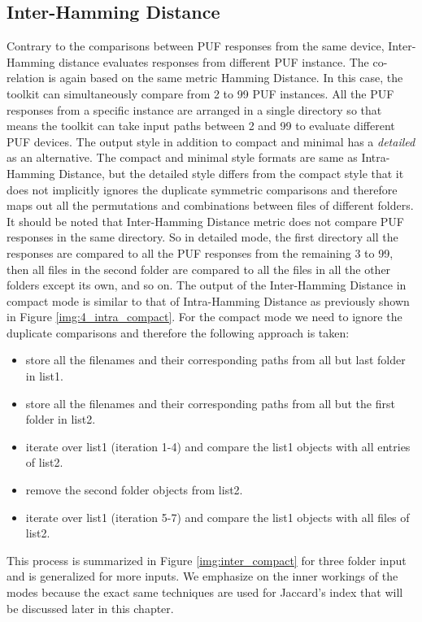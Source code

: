 \subsection{Inter-Hamming Distance}
\label{inter_hd_section}
Contrary to the comparisons between PUF responses from the same device, Inter-Hamming distance evaluates responses from different PUF instance. The co-relation is again based on the same metric Hamming Distance. In this case, the toolkit can simultaneously compare from 2 to 99 PUF instances. All the PUF responses from a specific instance are arranged in a single directory so that means the toolkit can take input paths between 2 and 99 to evaluate different PUF devices. The output
style in addition to compact and minimal has a \emph{detailed} as an alternative. The compact and minimal style formats are same as Intra-Hamming Distance, but the detailed style differs from the compact style that it does not implicitly ignores the duplicate symmetric comparisons and therefore maps out all the permutations and combinations between files of different folders. It should be noted that Inter-Hamming Distance metric does not compare PUF responses in the same directory. So
in detailed mode, the first directory all the responses are compared to all the PUF responses from the remaining 3 to 99, then all files in the second folder are compared to all the files in all the other folders except its own, and so on. The output of the Inter-Hamming Distance in compact mode is similar to that of Intra-Hamming Distance as previously shown in Figure \ref{img:4_intra_compact}. For the compact mode we need to ignore the duplicate comparisons and therefore the following approach is
taken:

\begin{itemize}
	\item store all the filenames and their corresponding paths from all but last folder in list1.
	\item store all the filenames and their corresponding paths from all but the first folder in list2.
	\item iterate over list1 (iteration 1-4) and compare the list1 objects with all entries of list2.
	\item remove the second folder objects from list2.
	\item iterate over list1 (iteration 5-7) and compare the list1 objects with all files of list2.
\end{itemize}

This process is summarized in Figure \ref{img:inter_compact} for three folder input and is generalized for more inputs. We emphasize on the inner workings of the modes because the exact same techniques are used for Jaccard's index that will be discussed later in this chapter.\\

